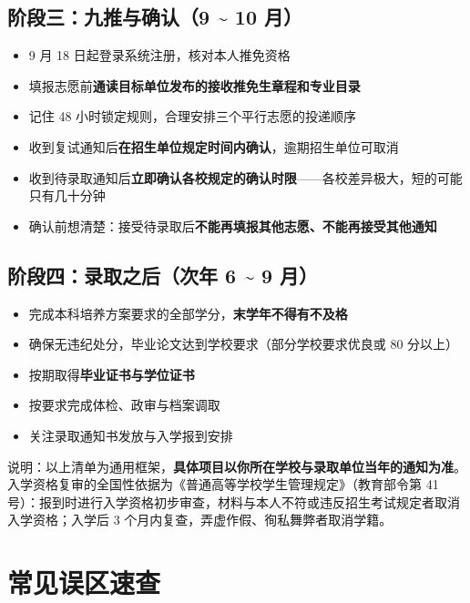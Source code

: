 \subsection*{阶段三：九推与确认（9 \textasciitilde{} 10 月）}

\begin{itemize}
\item[$\square$] 9 月 18 日起登录系统注册，核对本人推免资格
\item[$\square$] 填报志愿前\textbf{通读目标单位发布的接收推免生章程和专业目录}
\item[$\square$] 记住 48 小时锁定规则，合理安排三个平行志愿的投递顺序
\item[$\square$] 收到复试通知后\textbf{在招生单位规定时间内确认}，逾期招生单位可取消
\item[$\square$] 收到待录取通知后\textbf{立即确认各校规定的确认时限}——各校差异极大，短的可能只有几十分钟
\item[$\square$] 确认前想清楚：接受待录取后\textbf{不能再填报其他志愿、不能再接受其他通知}
\end{itemize}

\subsection*{阶段四：录取之后（次年 6 \textasciitilde{} 9 月）}

\begin{itemize}
\item[$\square$] 完成本科培养方案要求的全部学分，\textbf{末学年不得有不及格}
\item[$\square$] 确保无违纪处分，毕业论文达到学校要求（部分学校要求优良或 80 分以上）
\item[$\square$] 按期取得\textbf{毕业证书与学位证书}
\item[$\square$] 按要求完成体检、政审与档案调取
\item[$\square$] 关注录取通知书发放与入学报到安排
\end{itemize}

\noindent 说明：以上清单为通用框架，\textbf{具体项目以你所在学校与录取单位当年的通知为准}。入学资格复审的全国性依据为《普通高等学校学生管理规定》（教育部令第 41 号）：报到时进行入学资格初步审查，材料与本人不符或违反招生考试规定者取消入学资格；入学后 3 个月内复查，弄虚作假、徇私舞弊者取消学籍。

\section{常见误区速查}


